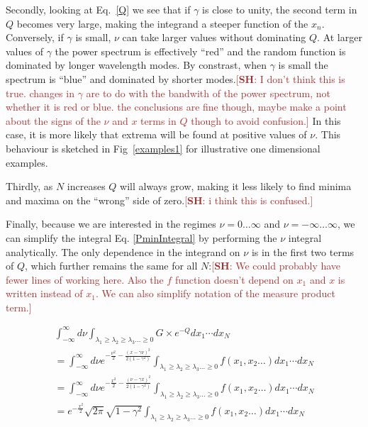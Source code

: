 \documentclass[12pt]{article}
\newcommand{\SH}[1]{\textcolor{brown}{[{\bf SH}: #1]}}
\begin{document}
Secondly,  looking at Eq.~\ref{Q} we see that if $\gamma$ is close to unity,  the second term in $Q$ becomes very large, making the integrand a steeper function of the $x_n$. Conversely, if   $\gamma$ is small, $\nu$ can take larger values without dominating $Q$.  At larger values of $\gamma$ the power spectrum is effectively ``red'' and the random function is dominated by longer wavelength modes. By constrast, when $\gamma$ is small the spectrum is ``blue'' and dominated by shorter modes.\SH{I don't think this is true. changes in $\gamma$ are to do with the bandwith of the power spectrum, not whether it is red or blue. the conclusions are fine though, maybe make a point about the signs of the $\nu$ and $x$ terms in $Q$ though to avoid confusion.} In this case, it is more likely that extrema will be found at positive values of $\nu$. This behaviour is sketched in Fig~\ref{examples1} for illustrative one dimensional examples. 

Thirdly, as $N$ increases $Q$ will always grow, making it less likely to find minima and maxima on the ``wrong'' side of zero.\SH{i think this is confused.}

Finally, because we are interested in the regimes $\nu = 0 \ldots \infty$ and $\nu = -\infty \ldots \infty$, we can simplify the integral Eq. \ref{PminIntegral} by performing the $\nu$ integral analytically. The only dependence in the integrand on $\nu$ is in the first two terms of $Q$, which further remains the same for all $N$:\SH{We could probably have fewer lines of working here. Also the $f$ function doesn't depend on $x_1$ and $x$ is written instead of $x_1$. We can also simplify notation of the measure product term.}

\begin{equation}
\begin{split}
\int^\infty_{-\infty} d\nu \int_{\lambda_1 \geq \lambda_2 \geq \lambda_3 \ldots \geq 0} G \times e^{-Q} dx_1  \cdots dx_N \\ 
= \int^\infty_{-\infty} d\nu e^{-\frac{\nu^2}{2}- \frac{(x- \gamma \nu)^2}{2(1-\gamma^2)}} \int_{\lambda_1 \geq \lambda_2 \geq \lambda_3 \ldots \geq 0} f(x_1, x_2 \ldots) dx_1  \cdots dx_N \\
= \int^\infty_{-\infty} d\nu e^{-\frac{x^2}{2}- \frac{(\nu - \gamma x)^2}{2(1-\gamma^2)}} \int_{\lambda_1 \geq \lambda_2 \geq \lambda_3 \ldots \geq 0} f(x_1, x_2 \ldots) dx_1  \cdots dx_N \\
= e^{-\frac{x^2}{2}} \sqrt{2\pi}\sqrt{1-\gamma^2}  \int_{\lambda_1 \geq \lambda_2 \geq \lambda_3 \ldots \geq 0} f(x_1, x_2 \ldots) dx_1  \cdots dx_N
\end{split}
\end{equation}
\end{document}
